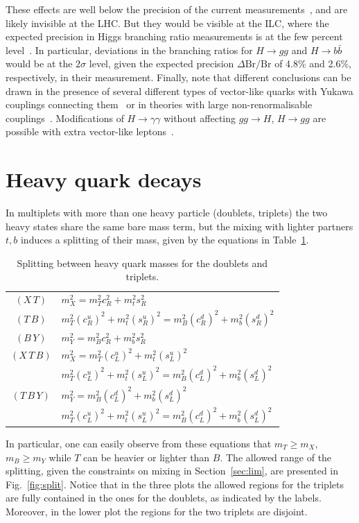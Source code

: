 \documentclass[12pt,a4paper]{article}
\newcommand{\xt}{$(X\,T)$}
\newcommand{\tb}{$(T\,B)$}
\newcommand{\by}{$(B\,Y)$}
\newcommand{\xtb}{$(X\,T\,B)$}
\newcommand{\tby}{$(T\,B\,Y)$}
\newcommand{\slu}{s_L^u}
\newcommand{\sld}{s_L^d}
\newcommand{\clu}{c_L^u}
\newcommand{\cld}{c_L^d}
\newcommand{\srx}{s_R}
\newcommand{\sru}{s_R^u}
\newcommand{\srd}{s_R^d}
\newcommand{\crx}{c_R}
\newcommand{\cru}{c_R^u}
\newcommand{\crd}{c_R^d}
\begin{document}
These effects are well below the precision of the current measurements~\cite{ATLAS:2013sla,CMS:yva}, and are likely invisible at the LHC. But they would be visible at the ILC, where the expected precision in Higgs branching ratio measurements is at the few percent level~\cite{DBD}. In particular, deviations in the branching ratios for $H \to gg$ and $H \to b \bar b$ would be at the $2\sigma$ level, given the expected precision $\Delta \text{Br}/\text{Br}$ of 4.8\% and 2.6\%, respectively, in their measurement.
Finally, note that different conclusions can be drawn in the presence of several different types of vector-like quarks with Yukawa couplings connecting them~\cite{Bonne:2012im,Almeida:2012bq,Batell:2012ca,Moreau:2012da} or in theories with large non-renormalisable couplings~\cite{Fajfer:2013wca}. Modifications of $H \to \gamma \gamma$ without affecting $gg \to H$, $H \to gg$ are possible with extra vector-like leptons~\cite{Ishiwata:2011hr,Carena:2012xa,Joglekar:2012vc,ArkaniHamed:2012kq}.



\section{Heavy quark decays}
\label{sec:split}
\label{sec:dec}

In multiplets with more than one heavy particle (doublets, triplets) the two heavy states share the same bare mass term, but the mixing with lighter partners $t,b$ induces a splitting of their mass, given by the equations in Table~\ref{tab:split}.
%
\begin{table}[htb]
\begin{center}
\begin{tabular}{cl}
\xt & $m_X^2 = m_T^2 \crx^2 + m_t^2 \srx^2$ \\
\tb & $m_T^2 (\cru)^2 + m_t^2 (\sru)^2 = m_B^2 (\crd)^2 + m_b^2 (\srd)^2$ \\
\by & $m_Y^2 = m_B^2 \crx^2 + m_b^2 \srx^2$ \\
\xtb & $m_X^2 = m_T^2 (\clu)^2 + m_t^2 (\slu)^2$ \\
       & $m_T^2 (\clu)^2 + m_t^2 (\slu)^2 = m_B^2 (\cld)^2 + m_b^2 (\sld)^2$ \\
\tby & $m_Y^2 = m_B^2 (\cld)^2 + m_b^2 (\sld)^2$ \\
       & $m_T^2 (\clu)^2 + m_t^2 (\slu)^2 = m_B^2 (\cld)^2 + m_b^2 (\sld)^2$
\end{tabular}
\caption{Splitting between heavy quark masses for the doublets and triplets.}
\label{tab:split}
\end{center}
\end{table}
%
In particular, one can easily observe from these equations that $m_T \geq m_X$, $m_B \geq m_Y$ while $T$ can be heavier or lighter than $B$. The allowed range of the splitting, given the constraints on mixing in Section~\ref{sec:lim}, are presented in Fig.~\ref{fig:split}. Notice that in the three plots the allowed regions for the triplets are fully contained in the ones for the doublets, as indicated by the labels. Moreover, in the lower plot the regions for the two triplets are disjoint. 
\end{document}
